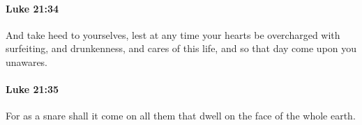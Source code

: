 		\paragraph{Luke 21:34} %
			\label{LUKE-21-34}

			And take heed to yourselves, lest at any time your hearts be overcharged with surfeiting, and drunkenness, and cares of this life, and so that day come upon you unawares.

			\begin{framed}
			\scriptsize
				\begin{compactdesc}
					\item[SBLG] 
				\end{compactdesc}
			\end{framed}

		\paragraph{Luke 21:35} %
			\label{LUKE-21-35}

			For as a snare shall it come on all them that dwell on the face of the whole earth.

